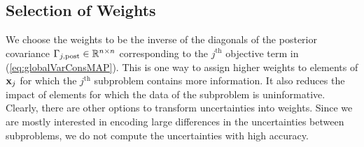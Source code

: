 \documentclass[11pt]{article}          %
\newcommand{\bbR}{\mathbb{R}}
\newcommand{\bfx}{{\bf  x}}
\begin{document}
\subsection{Selection of Weights}\label{subsec:weights}
We choose the weights to be the inverse of the diagonals of the posterior covariance $\Gamma_{j, \rm post} \in \bbR^{n \times n}$ corresponding to the $j^{\text{th}}$ objective term in (\ref{eq:globalVarConsMAP}). This is one way to assign higher weights to elements of $\bfx_j$ for which the $j^{\text{th}}$ subproblem contains more information. It also reduces the impact of elements for which the data of the subproblem is uninformative. Clearly, there are other options to transform uncertainties into weights. Since we are mostly interested in encoding large differences in the uncertainties between subproblems, we do not compute the uncertainties with high accuracy. 
\end{document}
